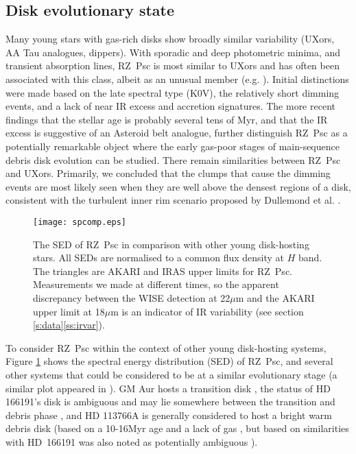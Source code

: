 \documentclass[]{rsos}
\begin{document}
\subsection{Disk evolutionary state}\label{ss:evol}

Many young stars with gas-rich disks show broadly similar variability (UXors, AA Tau
analogues, dippers). With sporadic and deep photometric minima, and transient absorption
lines, RZ~Psc is most similar to UXors and has often been associated with this class,
albeit as an unusual member (e.g. \cite{2010A&A...524A...8G}). Initial distinctions were
made based on the late spectral type (K0V), the relatively short dimming events, and a
lack of near IR excess and accretion signatures. The more recent findings that the
stellar age is probably several tens of Myr, and that the IR excess is suggestive of an
Asteroid belt analogue, further distinguish RZ~Psc as a potentially remarkable object
where the early gas-poor stages of main-sequence debris disk evolution can be
studied. There remain similarities between RZ~Psc and UXors. Primarily, we concluded that
the clumps that cause the dimming events are most likely seen when they are well above
the densest regions of a disk, consistent with the turbulent inner rim scenario proposed
by Dullemond et al. \cite{2003ApJ...594L..47D}.

\begin{figure}
  \begin{center}
    \hspace{-0.5cm} \texttt{[image: spcomp.eps]}
    \caption{The SED of RZ~Psc in comparison with other young disk-hosting stars. All
      SEDs are normalised to a common flux density at $H$ band. The triangles are AKARI
      and IRAS upper limits for RZ~Psc. Measurements we made at different times, so the
      apparent discrepancy between the WISE detection at 22$\mu$m and the AKARI upper
      limit at 18$\mu$m is an indicator of IR variability (see section
      \ref{s:data}\ref{ss:irvar}).}\label{fig:spcomp}
  \end{center}
\end{figure}

To consider RZ~Psc within the context of other young disk-hosting systems, Figure
\ref{fig:spcomp} shows the spectral energy distribution (SED) of RZ~Psc, and several
other systems that could be considered to be at a similar evolutionary stage (a similar
plot appeared in \cite{2014MNRAS.438.3299K}). GM Aur hosts a transition disk
\cite{2005ApJ...630L.185C}, the status of HD 166191's disk is ambiguous and may lie
somewhere between the transition and debris phase
\cite{2013ApJ...777...78S,2014MNRAS.438.3299K}, and HD 113766A is generally considered to
host a bright warm debris disk (based on a 10-16Myr age and a lack of gas
\cite{2006ApJS..166..351C}, but based on similarities with HD~166191 was also noted as
potentially ambiguous \cite{2014MNRAS.438.3299K}).
\end{document}
